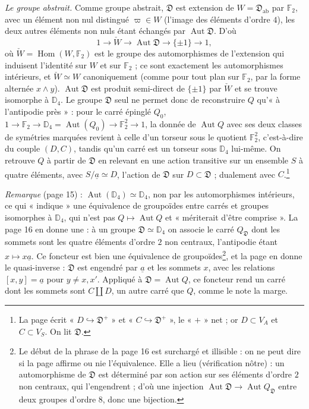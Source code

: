 \documentclass[11pt,a4paper]{article}
\begin{document}
\emph{Le groupe abstrait.} Comme groupe abstrait, $\mathfrak{D}$ est extension
de $W = \mathfrak{D}_{\mathrm{ab}}$ par $\mathbb{F}_2$, avec un élément non nul
distingué $\varpi \in W$ (l'image des éléments d'ordre $4$), les deux autres
éléments non nuls étant échangés par $\operatorname{Aut} \mathfrak{D}$. D'où
\[
1 \to \check{W} \to \operatorname{Aut} \mathfrak{D} \to \{\pm 1\} \to 1,
\]
où $\check{W} = \operatorname{Hom}(W, \mathbb{F}_2)$ est le groupe des
automorphismes de l'extension qui induisent l'identité sur $W$ et sur
$\mathbb{F}_2$ ; ce sont exactement les automorphismes intérieurs, et
$\check{W} \simeq W$ canoniquement (comme pour tout plan sur $\mathbb{F}_2$, par
la forme alternée $x \wedge y$). $\operatorname{Aut} \mathfrak{D}$ est produit
semi-direct de $\{\pm 1\}$ par $\check{W}$ et se trouve isomorphe à
$\mathbb{D}_4$. Le groupe $\mathfrak{D}$ seul ne permet donc de reconstruire
$Q$ qu'« à l'antipodie près » : pour le carré épinglé $Q_0$,
$1 \to \mathbb{F}_2 \to \mathbb{D}_4 = \operatorname{Aut}(Q_0) \to
\mathbb{F}_2^2 \to 1$, la donnée de $\operatorname{Aut} Q$ avec ses deux classes
de symétries marquées revient à celle d'un torseur sous le quotient
$\mathbb{F}_2^2$, c'est-à-dire du couple $(D, C)$, tandis qu'un carré est un
torseur sous $\mathbb{D}_4$ lui-même. On retrouve $Q$ à partir de
$\mathfrak{D}$ en relevant en une action transitive sur un ensemble $S$ à quatre
éléments, avec $S/\underline{a} \simeq D$, l'action de $\mathfrak{D}$ sur
$D \subset \mathfrak{D}$ ; dualement avec $C$.\footnote{La page écrit
« $D \hookrightarrow \mathfrak{D}^{+}$ » et
« $C \hookrightarrow \mathfrak{D}^{+}$ », le « $+$ » net ; or $D \subset V_A$ et
$C \subset V_S$. On lit $\mathfrak{D}$.}

\emph{Remarque} (page 15) : $\operatorname{Aut}(\mathbb{D}_4) \simeq \mathbb{D}_4$,
non par les automorphismes intérieurs, ce qui « indique » une équivalence de
groupoïdes entre carrés et groupes isomorphes à $\mathbb{D}_4$, qui n'est pas
$Q \mapsto \operatorname{Aut} Q$ et « mériterait d'être comprise ». La page 16
en donne une : à un groupe $\mathfrak{D} \simeq \mathbb{D}_4$ on associe le
carré $Q_{\mathfrak{D}}$ dont les sommets sont les quatre éléments d'ordre $2$
non centraux, l'antipodie étant $x \mapsto x\underline{a}$. Ce foncteur est
bien une équivalence de groupoïdes\footnote{Le début de la phrase de la page 16
est surchargé et illisible : on ne peut dire si la page affirme ou nie
l'équivalence. Elle a lieu (vérification nôtre) : un automorphisme de
$\mathfrak{D}$ est déterminé par son action sur ses éléments d'ordre $2$ non
centraux, qui l'engendrent ; d'où une injection
$\operatorname{Aut} \mathfrak{D} \to \operatorname{Aut} Q_{\mathfrak{D}}$ entre
deux groupes d'ordre $8$, donc une bijection.}, et la page en donne le
quasi-inverse : $\mathfrak{D}$ est engendré par $\underline{a}$ et les
sommets $x$, avec les relations $[x, y] = \underline{a}$ pour $y \neq x, x'$.
Appliqué à $\mathfrak{D} = \operatorname{Aut} Q$, ce foncteur rend un carré
dont les sommets sont $C \amalg D$, un autre carré que $Q$, comme le note la
marge.
\end{document}
